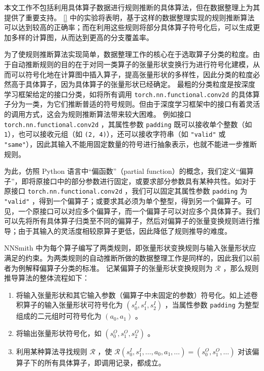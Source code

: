 本文工作不包括利用具体算子数据进行规则推断的具体算法，但在数据整理上为其提供了重要支持。 \ref{} 中的实验将表明，基于这样的数据整理实现的规则推断算法可以达到较高的正确率；而在利用这些规则将部分具体算子符号化后，可以生成更加多样的计算图，从而达到更高的分支覆盖率。

为了使规则推断算法实现简单，数据整理工作的核心在于选取算子分类的粒度。由于自动推断规则的目的在于对同一类算子的张量形状变换行为进行符号化建模，从而可以符号化地在计算图中插入算子，提高张量形状的多样性，因此分类的粒度必然高于具体算子，因为具体算子的张量形状已经确定。
最粗的分类粒度是按深度学习框架给定的接口分类，如将所有调用 \texttt{torch.nn.functional.conv2d} 的具体算子分为一类，为它们推断普适的符号规则。但由于深度学习框架中的接口有着灵活的调用方式，这会为规则推断算法带来较大困难。
例如接口 \texttt{torch.nn.functional.conv2d} \cite{torch_f_conv2d}，其属性参数 \texttt{padding} 既可以接收单个整数（如 \texttt{1}），也可以接收元组（如 \texttt{(2, 4)}），还可以接收字符串（如 \texttt{"valid"} 或 \texttt{"same"}），因此其输入不能用固定数量的符号进行抽象表示，也就不能进一步推断规则。

为此，仿照 Python 语言中“偏函数”（partial function）\cite{python_partial}的概念，我们定义“偏算子”，即将原接口中的部分参数进行固定，或要求部分参数具有某种共性。如对于原接口 \texttt{torch.nn.functional.conv2d} ，我们可以固定其属性参数 \texttt{padding} 为 \texttt{"valid"} ，得到一个偏算子；或要求其必须为单个整型，得到另一个偏算子。可见，一个原接口可以对应多个偏算子，而一个偏算子可以对应多个具体算子。我们可以先将所有具体算子归类至不同的偏算子，然后对偏算子的张量变换规则进行推导；由于其输入的灵活度相较原算子更低，因此降低了规则推导的难度。

NNSmith 中为每个算子编写了两类规则，即张量形状变换规则与输入张量形状应满足的约束。为两类规则的自动推断所做的数据整理工作是同样的，因此我们以前者为例解释偏算子分类的标准。
记某偏算子的张量形状变换规则为 $\mathcal{R}$ ，那么规则推导算法的整体流程如下：
\begin{enumerate}
    \item 将输入张量形状和其它输入参数（偏算子中未固定的参数）符号化。如上述卷积算子的输入张量形状可符号化为 $(s^I_0, s^I_1, s^I_2)$ ，当属性参数 \texttt{padding} 为整型组成的二元组时可符号化为 $(a_0, a_1)$ 。
    \item 将输出张量形状符号化，如 $(s^O_0, s^O_1, s^O_2)$ 。
    \item 利用某种算法寻找规则 $\mathcal{R}$ ，使 $\mathcal{R}(s^I_0, s^I_1, \dots, a_0, a_1, \dots) = (s^O_0, s^O_1, \dots)$ 对该偏算子下的所有具体算子，即调用记录，都成立。
\end{enumerate}

